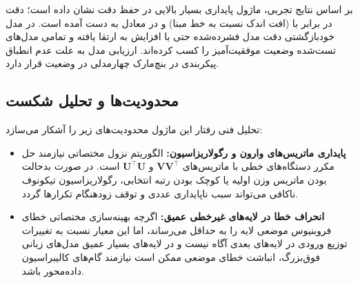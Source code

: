 بر اساس نتایج تجربی، ماژول  پایداری بسیار بالایی در حفظ دقت نشان داده است؛ دقت در  برابر با  (افت اندک  نسبت به خط مبنا) و در  معادل  به دست آمده است. در مدل خودبازگشتی  دقت مدل فشرده‌شده حتی با افزایش  به  ارتقا یافته و تمامی مدل‌های تست‌شده وضعیت موفقیت‌آمیز  را کسب کرده‌اند. ارزیابی مدل  به علت عدم انطباق پیکربندی در بنچ‌مارک چهارمدلی در وضعیت  قرار دارد.

\subsection{محدودیت‌ها و تحلیل شکست}
تحلیل فنی رفتار این ماژول محدودیت‌های زیر را آشکار می‌سازد:
\begin{itemize}
    \item \textbf{پایداری ماتریس‌های وارون و رگولاریزاسیون:} الگوریتم نزول مختصاتی نیازمند حل مکرر دستگاه‌های خطی با ماتریس‌های $\mathbf{V}\mathbf{V}^\top$ و $\mathbf{U}^\top\mathbf{U}$ است. در صورت بدحالت بودن ماتریس وزن اولیه یا کوچک بودن رتبه انتخابی، رگولاریزاسیون تیکونوف ناکافی می‌تواند سبب ناپایداری عددی و توقف زودهنگام تکرارها گردد.
    \item \textbf{انحراف خطا در لایه‌های غيرخطی عمیق:} اگرچه بهینه‌سازی مختصاتی خطای فروبنیوس موضعی لایه را به حداقل می‌رساند، اما این معیار نسبت به تغییرات توزیع ورودی در لایه‌های بعدی آگاه نیست و در لایه‌های بسیار عمیق مدل‌های زبانی فوق‌بزرگ، انباشت خطای موضعی ممکن است نیازمند گام‌های کالیبراسیون داده‌محور باشد.
\end{itemize}
